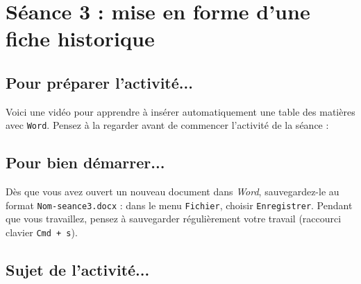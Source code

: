 







%
%
%
%

\newpage

\section{Séance 3 : mise en forme d'une fiche historique}\label{ficheTexte5e3}

\subsection{Pour préparer l'activité...}

\vspace{10pt}

Voici une vidéo pour apprendre à insérer automatiquement une table des matières avec \texttt{Word}. Pensez à la regarder avant de commencer l'activité de la séance :

\begin{center}
\end{center}

\vspace{12pt}

\subsection{Pour bien démarrer...}

\vspace{10pt}

Dès que vous avez ouvert un nouveau document dans \emph{Word}, sauvegardez-le au format \texttt{Nom-seance3.docx} : dans le menu \texttt{Fichier}, choisir \texttt{Enregistrer}. Pendant que vous travaillez, pensez à sauvegarder régulièrement votre travail (raccourci clavier \texttt{Cmd + s}).   




\subsection{Sujet de l'activité...}

\vspace{10pt}

